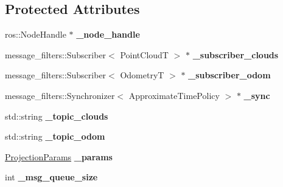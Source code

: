 \subsection*{Protected Attributes}
\begin{DoxyCompactItemize}
\item 
\mbox{\label{classdepth__clustering_1_1CloudOdomRosSubscriber_af44b4e9d0bfe1c030324ea4600a8d49e}} 
ros\+::\+Node\+Handle $\ast$ {\bfseries \+\_\+node\+\_\+handle}
\item 
\mbox{\label{classdepth__clustering_1_1CloudOdomRosSubscriber_a47a509c60650a113d7aba3a36c7a6a17}} 
message\+\_\+filters\+::\+Subscriber$<$ Point\+CloudT $>$ $\ast$ {\bfseries \+\_\+subscriber\+\_\+clouds}
\item 
\mbox{\label{classdepth__clustering_1_1CloudOdomRosSubscriber_a869ac4843118077f95777dc483d13873}} 
message\+\_\+filters\+::\+Subscriber$<$ OdometryT $>$ $\ast$ {\bfseries \+\_\+subscriber\+\_\+odom}
\item 
\mbox{\label{classdepth__clustering_1_1CloudOdomRosSubscriber_a4829e587d2ae9c5fee5e3cf753cdeee9}} 
message\+\_\+filters\+::\+Synchronizer$<$ Approximate\+Time\+Policy $>$ $\ast$ {\bfseries \+\_\+sync}
\item 
\mbox{\label{classdepth__clustering_1_1CloudOdomRosSubscriber_ac172f353e2f6fec4d8f07b3a431048a1}} 
std\+::string {\bfseries \+\_\+topic\+\_\+clouds}
\item 
\mbox{\label{classdepth__clustering_1_1CloudOdomRosSubscriber_ad1c0dcb17a16f5611d13afb8e76656e5}} 
std\+::string {\bfseries \+\_\+topic\+\_\+odom}
\item 
\mbox{\label{classdepth__clustering_1_1CloudOdomRosSubscriber_a0661d98cffa781b355209e71075983b1}} 
\hyperlink{classdepth__clustering_1_1ProjectionParams}{Projection\+Params} {\bfseries \+\_\+params}
\item 
\mbox{\label{classdepth__clustering_1_1CloudOdomRosSubscriber_a4d9749a4c49ef4c91807ab2a573e33fe}} 
int {\bfseries \+\_\+msg\+\_\+queue\+\_\+size}
\end{DoxyCompactItemize}
